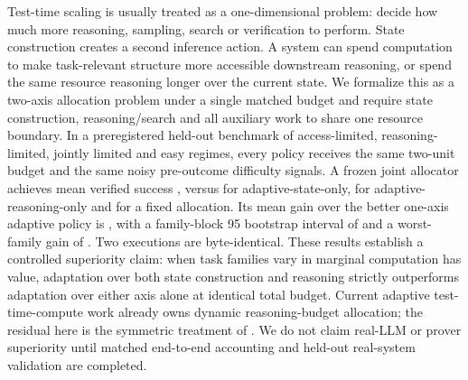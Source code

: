 \markdownRendererDocumentBegin
Test-time scaling is usually treated as a one-dimensional problem: decide how much more reasoning, sampling, search or verification to perform. State construction creates a second inference action. A system can spend computation to make task-relevant structure more accessible  downstream reasoning, or spend the same resource reasoning longer over the current state. We formalize this as a two-axis allocation problem under a single matched budget and require state construction, reasoning/search and all auxiliary work to share one resource boundary. In a preregistered held-out benchmark of access-limited, reasoning-limited, jointly limited and easy regimes, every policy receives the same two-unit budget and the same noisy pre-outcome difficulty signals. A frozen joint allocator achieves mean verified success , versus  for adaptive-state-only,  for adaptive-reasoning-only and  for a fixed  allocation. Its mean gain over the better one-axis adaptive policy is , with a family-block 95\markdownRendererPercentSign{} bootstrap interval of \markdownRendererStrongEmphasis{[0.2860, 0.3827]} and a worst-family gain of . Two executions are byte-identical. These results establish a controlled superiority claim: when task families vary in  marginal computation has value, adaptation over both state construction and reasoning strictly outperforms adaptation over either axis alone at identical total budget. Current adaptive test-time-compute work already owns dynamic reasoning-budget allocation; the residual here is the symmetric treatment of . We do not claim real-LLM or prover superiority until matched end-to-end accounting and held-out real-system validation are completed.\markdownRendererDocumentEnd